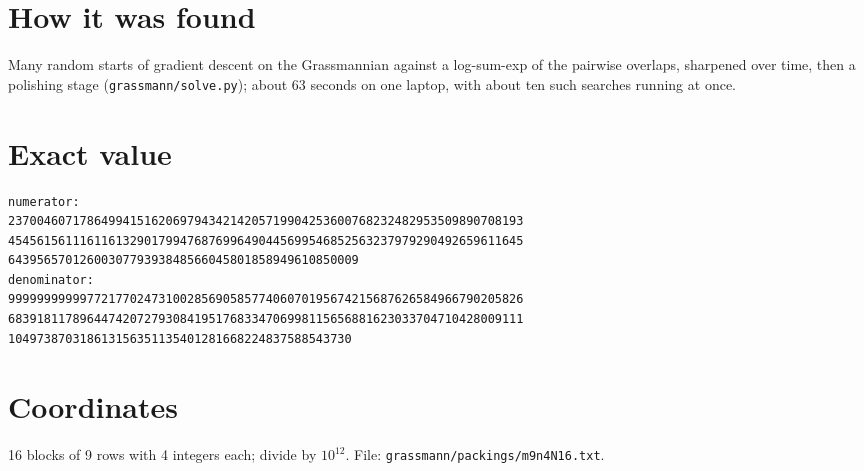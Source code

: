 \documentclass[11pt,a4paper]{article}
\begin{document}
\section{How it was found}
Many random starts of gradient descent on the Grassmannian against a log-sum-exp of the pairwise overlaps, sharpened over time, then a polishing stage (\texttt{grassmann/solve.py}); about 63 seconds on one laptop, with about ten such searches running at once.


\appendix
\section{Exact value}
{\small
\begin{verbatim}
numerator:
237004607178649941516206979434214205719904253600768232482953509890708193
454561561116116132901799476876996490445699546852563237979290492659611645
6439565701260030779393848566045801858949610850009
denominator:
999999999997721770247310028569058577406070195674215687626584966790205826
683918117896447420727930841951768334706998115656881623033704710428009111
104973870318613156351135401281668224837588543730
\end{verbatim}}

\section{Coordinates}
16 blocks of 9 rows with 4 integers each; divide by $10^{12}$. File: \texttt{grassmann/packings/m9n4N16.txt}.
{\tiny
\begin{multicols}{3}
\end{multicols}}
\end{document}
